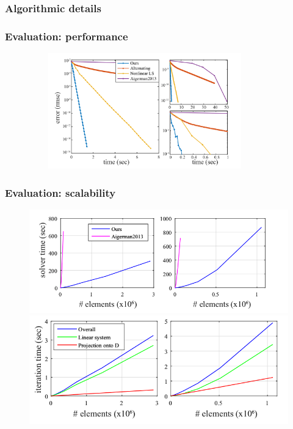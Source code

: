 \documentclass[serif,mathserif]{beamer}
\begin{document}
\begin{frame}
 \frametitle{Algorithmic details}
\end{frame}


\begin{frame}
 \frametitle{Evaluation: performance}
 \begin{figure}
  \centering
  \includegraphics[width=10cm, height=5cm]{img/performance.png}
 \end{figure}
\end{frame}

\begin{frame}
 \frametitle{Evaluation: scalability}
 \begin{figure}[t]
  \centering  
  \begin{minipage}[t][0.9\textheight][s]{1\textwidth}
    \centering
    \includegraphics[scale=0.35]{img/sc0.png} 
    \vfill
    \includegraphics[scale=0.35]{img/sc1.png}
  \end{minipage}
 \end{figure}
\end{frame}
\end{document}
